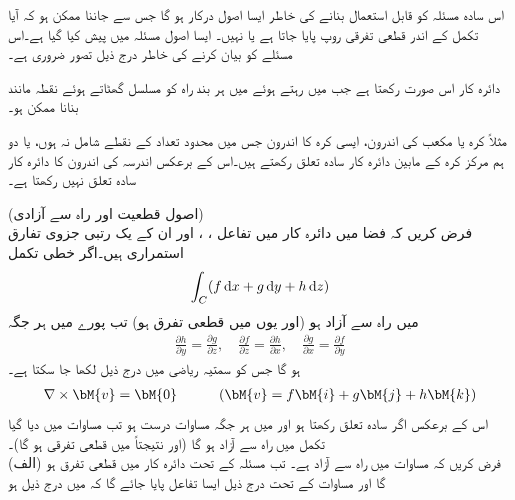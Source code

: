 اس سادہ مسئلہ کو قابل استعمال بنانے کی خاطر  ایسا اصول درکار ہو گا جس سے جاننا ممکن ہو کہ آیا تکمل کے اندر قطعی تفرقی روپ پایا جاتا ہے یا نہیں۔ ایسا اصول  مسئلہ  میں پیش کیا گیا ہے۔اس مسئلے کو بیان کرنے کی خاطر درج ذیل تصور ضروری ہے۔

دائرہ کار  اس صورت  رکھتا ہے جب  میں رہتے ہوئے   میں ہر بند راہ کو  مسلسل گھٹاتے ہوئے نقطہ مانند بنانا ممکن ہو۔ 

مثلاً کرہ یا مکعب کی اندرون، ایسی کرہ کا اندرون جس میں محدود تعداد کے نقطے شامل نہ ہوں، یا دو ہم مرکز کرہ کے مابین دائرہ کار سادہ تعلق رکھتے ہیں۔اس کے برعکس  اندرسہ کی اندرون کا دائرہ کار سادہ تعلق نہیں رکھتا ہے۔   

 \quad (اصول قطعیت اور راہ سے آزادی)\\
فرض کریں کہ فضا میں دائرہ کار  میں تفاعل ، ،  اور ان کے یک رتبی جزوی تفارق استمراری ہیں۔اگر خطی تکمل
\begin{align}\label{مساوات_خطی_تکمل_اصول_قطعیت_الف}
\int_C (f\dif x+g\dif y+h\dif z)
\end{align}
 میں راہ سے آزاد ہو (اور یوں  میں  قطعی تفرق ہو) تب پورے  میں ہر جگہ 
\begin{align}\label{مساوات_خطی_تکمل_اصول_قطعیت_ب}
\frac{\partial h}{\partial y}=\frac{\partial g}{\partial z}, \quad \frac{\partial f}{\partial z}=\frac{\partial h}{\partial x},\quad 
\frac{\partial g}{\partial x}=\frac{\partial f}{\partial y}
\end{align}
ہو گا جس کو سمتیہ ریاضی میں درج ذیل لکھا جا سکتا ہے۔
\begin{align}\label{مساوات_خطی_تکمل_اصول_قطعیت_پ}
\nabla \times \bM{v}=\bM{0}\quad \quad \quad (\bM{v}=f\bM{i}+g\bM{j}+h\bM{k})
\end{align}
اس کے برعکس اگر  سادہ تعلق رکھتا ہو اور   میں ہر جگہ مساوات  درست ہو تب مساوات  میں دیا گیا تکمل  میں راہ سے آزاد ہو گا (اور نتیجتاً  میں  قطعی تفرقی ہو گا)۔
\\
(الف) فرض کریں کہ مساوات   میں راہ سے آزاد ہے۔ تب مسئلہ  کے تحت 
 دائرہ کار  میں قطعی تفرق ہو گا اور مساوات  کے تحت درج ذیل  ایسا تفاعل  پایا جائے گا  کہ  میں درج ذیل ہو
